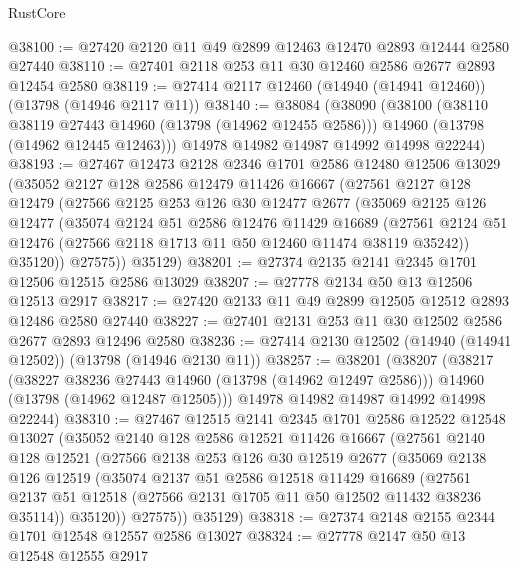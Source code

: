 \begin{lexlean}{RustCore}
\begin{coremodule}
@38100 := @27420 @2120 @11 @49 @2899 @12463 @12470 @2893 @12444 @2580 @27440
@38110 := @27401 @2118 @253 @11 @30 @12460 @2586 @2677 @2893 @12454 @2580
@38119 := @27414 @2117 @12460 (@14940 (@14941 @12460)) (@13798 (@14946 @2117 @11))
@38140 := @38084
    (@38090
      (@38100
        (@38110 @38119 @27443 @14960 (@13798 (@14962 @12455 @2586)))
        @14960
        (@13798 (@14962 @12445 @12463)))
      @14978
      @14982
      @14987
      @14992
      @14998
      @22244)
@38193 := @27467
    @12473
    @2128
    @2346
    @1701
    @2586
    @12480
    @12506
    @13029
    (@35052
      @2127
      @128
      @2586
      @12479
      @11426
      @16667
      (@27561
        @2127
        @128
        @12479
        (@27566
          @2125
          @253
          @126
          @30
          @12477
          @2677
          (@35069
            @2125
            @126
            @12477
            (@35074
              @2124
              @51
              @2586
              @12476
              @11429
              @16689
              (@27561 @2124 @51 @12476 (@27566 @2118 @1713 @11 @50 @12460 @11474 @38119 @35242))
              @35120))
          @27575))
      @35129)
@38201 := @27374 @2135 @2141 @2345 @1701 @12506 @12515 @2586 @13029
@38207 := @27778 @2134 @50 @13 @12506 @12513 @2917
@38217 := @27420 @2133 @11 @49 @2899 @12505 @12512 @2893 @12486 @2580 @27440
@38227 := @27401 @2131 @253 @11 @30 @12502 @2586 @2677 @2893 @12496 @2580
@38236 := @27414 @2130 @12502 (@14940 (@14941 @12502)) (@13798 (@14946 @2130 @11))
@38257 := @38201
    (@38207
      (@38217
        (@38227 @38236 @27443 @14960 (@13798 (@14962 @12497 @2586)))
        @14960
        (@13798 (@14962 @12487 @12505)))
      @14978
      @14982
      @14987
      @14992
      @14998
      @22244)
@38310 := @27467
    @12515
    @2141
    @2345
    @1701
    @2586
    @12522
    @12548
    @13027
    (@35052
      @2140
      @128
      @2586
      @12521
      @11426
      @16667
      (@27561
        @2140
        @128
        @12521
        (@27566
          @2138
          @253
          @126
          @30
          @12519
          @2677
          (@35069
            @2138
            @126
            @12519
            (@35074
              @2137
              @51
              @2586
              @12518
              @11429
              @16689
              (@27561 @2137 @51 @12518 (@27566 @2131 @1705 @11 @50 @12502 @11432 @38236 @35114))
              @35120))
          @27575))
      @35129)
@38318 := @27374 @2148 @2155 @2344 @1701 @12548 @12557 @2586 @13027
@38324 := @27778 @2147 @50 @13 @12548 @12555 @2917

\end{coremodule}
\end{lexlean}
